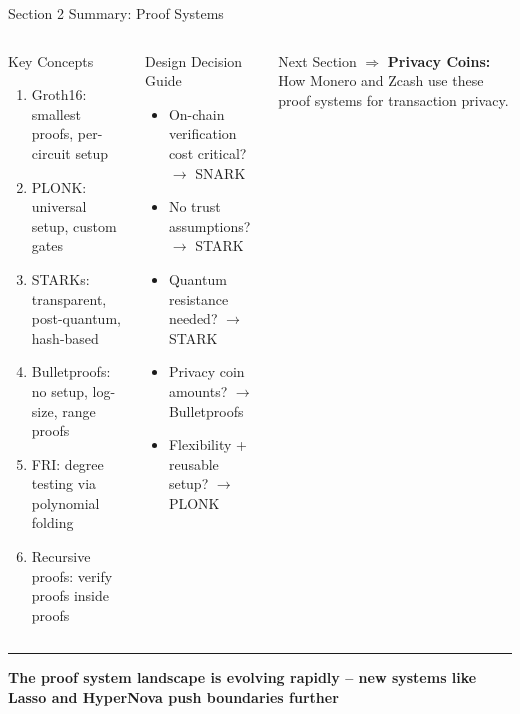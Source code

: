 \documentclass[8pt,aspectratio=169]{beamer}
\newcommand{\bottomnote}[1]{\vfill\vspace{-2mm}\textcolor{mllavender2}{\rule{\textwidth}{0.4pt}}\vspace{1mm}\footnotesize\textbf{#1}}
\begin{document}
\begin{frame}{Section 2 Summary: Proof Systems}
\begin{columns}[T]
\begin{block}{Key Concepts}
\footnotesize
\begin{enumerate}
  \item Groth16: smallest proofs, per-circuit setup
  \item PLONK: universal setup, custom gates
  \item STARKs: transparent, post-quantum, hash-based
  \item Bulletproofs: no setup, log-size, range proofs
  \item FRI: degree testing via polynomial folding
  \item Recursive proofs: verify proofs inside proofs
\end{enumerate}
\end{block}

\begin{block}{Design Decision Guide}
\footnotesize
\begin{itemize}
  \item[\textcolor{mlblue}{$\bullet$}] On-chain verification cost critical? $\rightarrow$ SNARK
  \item[\textcolor{mlgreen}{$\bullet$}] No trust assumptions? $\rightarrow$ STARK
  \item[\textcolor{mlorange}{$\bullet$}] Quantum resistance needed? $\rightarrow$ STARK
  \item[\textcolor{mlred}{$\bullet$}] Privacy coin amounts? $\rightarrow$ Bulletproofs
  \item[\textcolor{mlpurple}{$\bullet$}] Flexibility + reusable setup? $\rightarrow$ PLONK
\end{itemize}
\end{block}
\vspace{2mm}
\begin{exampleblock}{\footnotesize Next Section}
\footnotesize
$\Rightarrow$ \textbf{Privacy Coins:} How Monero and Zcash use these proof systems for transaction privacy.
\end{exampleblock}
\end{columns}
\bottomnote{The proof system landscape is evolving rapidly -- new systems like Lasso and HyperNova push boundaries further}
\end{frame}

\end{document}
